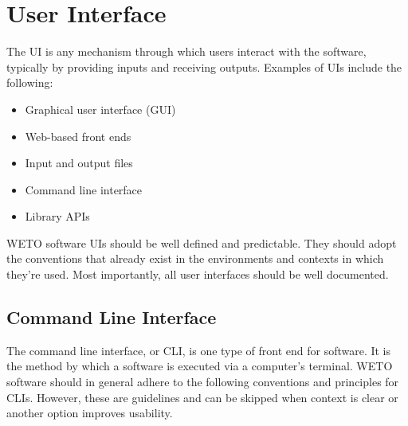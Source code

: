 \documentclass[]{nrel}
\begin{document}
\section{User Interface}
The UI is any mechanism through which users interact with the software,
typically by providing inputs and receiving outputs. Examples of UIs include the following:

\begin{itemize}
\item Graphical user interface (GUI)
\item Web-based front ends
\item Input and output files
\item Command line interface
\item Library APIs
\end{itemize}

WETO software UIs should be well defined and predictable.
They should adopt the conventions that already exist in the environments and contexts
in which they're used.
Most importantly, all user interfaces should be well documented.

\subsection{Command Line Interface}
The command line interface, or CLI, is one type of front end for software.
It is the method by which a software is executed via a computer’s terminal.
WETO software should in general adhere to the following conventions and principles for CLIs.
However, these are guidelines and can be skipped when context is clear or another
option improves usability.
\end{document}
